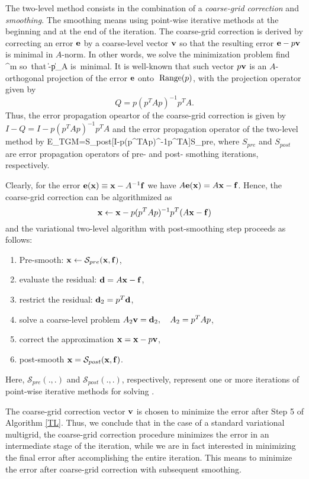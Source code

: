 The two-level method consists in the combination of
a {\em coarse-grid correction} and
{\em smoothing}. The smoothing means using point-wise iterative methods 
at the beginning and at the end of the iteration.
The coarse-grid correction is derived by correcting an error
${\bf e}$ by a coarse-level vector ${\bf v}$ so that the resulting error
${\bf e}-p{\bf v}$ is minimal in $A$-norm. In other words, we solve
the minimization problem
  \mbox{find} \;  \in \Re^m \; \mbox{so that} \;
  \| -p\|_A \; \mbox{is minimal}.
\qe
It is well-known that such vector $p{\bf v}$ is an $A$-orthogonal projection
of the error ${\bf e}$ onto ${\;\mathop {\rm Range}\nolimits}(p)$, with the projection
operator given by
$$
      Q = p(p^TAp)^{-1}p^TA.
$$
Thus, the error propagation opeartor of the coarse-grid correction is given by
$I-Q=I-p(p^TAp)^{-1}p^TA$ and the error propagation operator of the two-level
method by
      E_{TGM}=S_{post}[I-p(p^TAp)^{-1}p^TA]S_{pre},
\qe
where $S_{pre}$ and $S_{post}$ are error propagation operators of
pre- and post- smothing iterations, respectively.

Clearly, for the error ${\bf e}({\bf x})\equiv {\bf x}-A^{-1}{\bf f}$ we have
$A{\bf e}({\bf x})=A{\bf x}-{\bf f}$. Hence, the coarse-grid correction can be
algorithmized  as
$$
     {\bf x} \leftarrow {\bf x} - p(p^TAp)^{-1}p^T(A{\bf x}-{\bf f})
$$
and the variational two-level algorithm with post-smoothing step
proceeds as follows:
\begin{algorithm}
\label{TL}
\quad
\begin{enumerate}
\item Pre-smooth: ${\bf x} \leftarrow {\mathcal S}_{pre}({\bf x},{\bf f})$,
\item evaluate the residual:
   ${\bf d}=A{\bf x}-{\bf f}$,
\item restrict the residual:
   ${\bf d}_2 = p^T{\bf d}$,
\item solve a coarse-level problem
   $A_2 {\bf v} = {\bf d}_2,\quad A_2 = p^TAp$,
\item correct the approximation
   ${\bf x} = {\bf x} - p{\bf v}$,
\item post-smooth
   ${\bf x} = {\mathcal S}_{post}({\bf x},{\bf f})$.
\end{enumerate}
\end{algorithm}
Here, ${\mathcal S}_{pre}(.,.)$ and ${\mathcal S}_{post}(.,.)$, respectively,
represent one or more iterations of
point-wise iterative methods for solving .


The coarse-grid correction vector ${\bf v}$ is chosen to minimize the error
after Step 5 of Algorithm \ref{TL}.
Thus, we conclude that in the case of a standard variational multigrid,
the coarse-grid correction procedure minimizes
the error in an intermediate stage of the iteration,
while we are in fact interested in minimizing the final
error after accomplishing the entire iteration. This means to minimize
the error after coarse-grid correction with subsequent smoothing.



